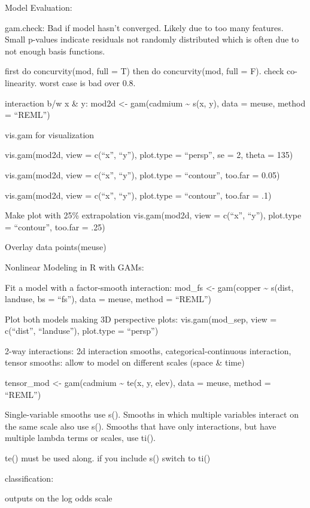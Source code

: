 \documentclass[]{book}
\begin{document}
Model Evaluation:

gam.check: Bad if model hasn't converged. Likely due to too many
features. Small p-values indicate residuals not randomly distributed
which is often due to not enough basis functions.

first do concurvity(mod, full = T) then do concurvity(mod, full = F).
check co-linearity. worst case is bad over 0.8.

interaction b/w x \& y: mod2d \textless{}- gam(cadmium \textasciitilde{}
s(x, y), data = meuse, method = ``REML'')

vis.gam for visualization

vis.gam(mod2d, view = c(``x'', ``y''), plot.type = ``persp'', se = 2,
theta = 135)

vis.gam(mod2d, view = c(``x'', ``y''), plot.type = ``contour'', too.far
= 0.05)

vis.gam(mod2d, view = c(``x'', ``y''), plot.type = ``contour'', too.far
= .1)

Make plot with 25\% extrapolation vis.gam(mod2d, view = c(``x'', ``y''),
plot.type = ``contour'', too.far = .25)

Overlay data points(meuse)

Nonlinear Modeling in R with GAMs:

Fit a model with a factor-smooth interaction: mod\_fs \textless{}-
gam(copper \textasciitilde{} s(dist, landuse, bs = ``fs''), data =
meuse, method = ``REML'')

Plot both models making 3D perspective plots: vis.gam(mod\_sep, view =
c(``dist'', ``landuse''), plot.type = ``persp'')

2-way interactions: 2d interaction smooths, categorical-continuous
interaction, tensor smooths: allow to model on different scales (space
\& time)

tensor\_mod \textless{}- gam(cadmium \textasciitilde{} te(x, y, elev),
data = meuse, method = ``REML'')

Single-variable smooths use s(). Smooths in which multiple variables
interact on the same scale also use s(). Smooths that have only
interactions, but have multiple lambda terms or scales, use ti().

te() must be used along. if you include s() switch to ti()

classification:

outputs on the log odds scale
\end{document}
